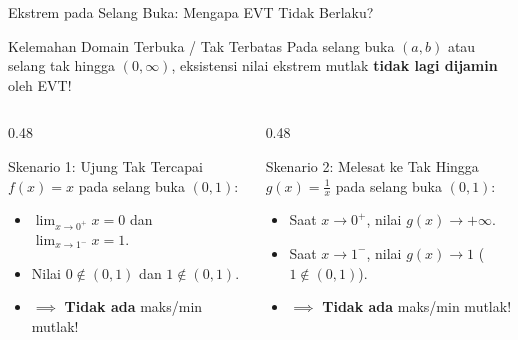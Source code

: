 \documentclass[aspectratio=43,10pt]{beamer}
\begin{document}
\begin{frame}{Ekstrem pada Selang Buka: Mengapa EVT Tidak Berlaku?}
    \begin{block}{Kelemahan Domain Terbuka / Tak Terbatas}
        Pada selang buka $(a, b)$ atau selang tak hingga $(0, \infty)$, eksistensi nilai ekstrem mutlak \textbf{tidak lagi dijamin} oleh EVT!
    \end{block}

    \vspace{0.06cm}
    \begin{columns}[T]
        \begin{column}{0.48\textwidth}
            \begin{alertblock}{Skenario 1: Ujung Tak Tercapai}
                $f(x) = x$ pada selang buka $(0, 1)$:
                \begin{itemize}
                    \item $\lim_{x \to 0^+} x = 0$ dan $\lim_{x \to 1^-} x = 1$.
                    \item Nilai $0 \notin (0, 1)$ dan $1 \notin (0, 1)$.
                    \item $\implies$ \textbf{Tidak ada} maks/min mutlak!
                \end{itemize}
            \end{alertblock}
        \end{column}

        \begin{column}{0.48\textwidth}
            \begin{alertblock}{Skenario 2: Melesat ke Tak Hingga}
                $g(x) = \frac{1}{x}$ pada selang buka $(0, 1)$:
                \begin{itemize}
                    \item Saat $x \to 0^+$, nilai $g(x) \to +\infty$.
                    \item Saat $x \to 1^-$, nilai $g(x) \to 1$ ($1 \notin (0, 1)$).
                    \item $\implies$ \textbf{Tidak ada} maks/min mutlak!
                \end{itemize}
            \end{alertblock}
        \end{column}
    \end{columns}
\end{frame}
\end{document}
